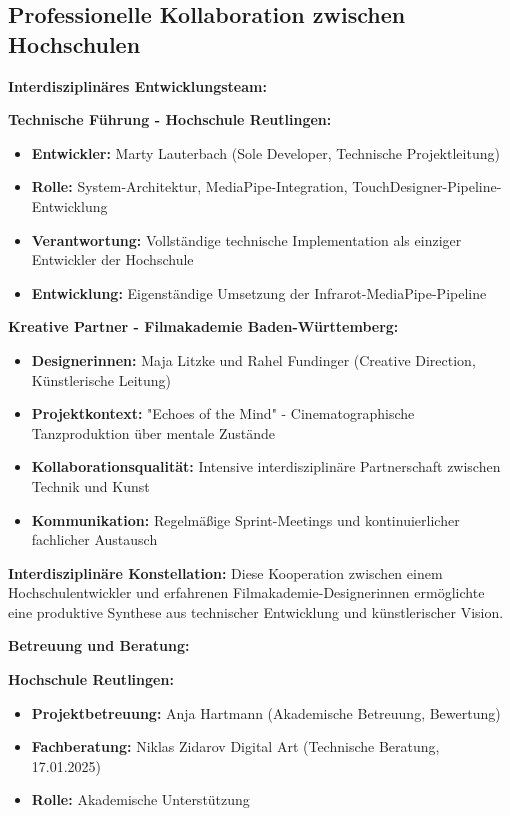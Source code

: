 \subsection{Professionelle Kollaboration zwischen Hochschulen}

\textbf{Interdisziplinäres Entwicklungsteam:}

\textbf{Technische Führung - Hochschule Reutlingen:}
\begin{itemize}
    \item \textbf{Entwickler:} Marty Lauterbach (Sole Developer, Technische Projektleitung)
    \item \textbf{Rolle:} System-Architektur, MediaPipe-Integration, TouchDesigner-Pipeline-Entwicklung
    \item \textbf{Verantwortung:} Vollständige technische Implementation als einziger Entwickler der Hochschule
    \item \textbf{Entwicklung:} Eigenständige Umsetzung der Infrarot-MediaPipe-Pipeline
\end{itemize}

\textbf{Kreative Partner - Filmakademie Baden-Württemberg:}
\begin{itemize}
    \item \textbf{Designerinnen:} Maja Litzke und Rahel Fundinger (Creative Direction, Künstlerische Leitung)
    \item \textbf{Projektkontext:} "Echoes of the Mind" - Cinematographische Tanzproduktion über mentale Zustände
    \item \textbf{Kollaborationsqualität:} Intensive interdisziplinäre Partnerschaft zwischen Technik und Kunst
    \item \textbf{Kommunikation:} Regelmäßige Sprint-Meetings und kontinuierlicher fachlicher Austausch
\end{itemize}

\textbf{Interdisziplinäre Konstellation:}
Diese Kooperation zwischen einem Hochschulentwickler und erfahrenen Filmakademie-Designerinnen ermöglichte eine produktive Synthese aus technischer Entwicklung und künstlerischer Vision.

\textbf{Betreuung und Beratung:}

\textbf{Hochschule Reutlingen:}
\begin{itemize}
    \item \textbf{Projektbetreuung:} Anja Hartmann (Akademische Betreuung, Bewertung)
    \item \textbf{Fachberatung:} Niklas Zidarov Digital Art (Technische Beratung, 17.01.2025)
    \item \textbf{Rolle:} Akademische Unterstützung
\end{itemize}

